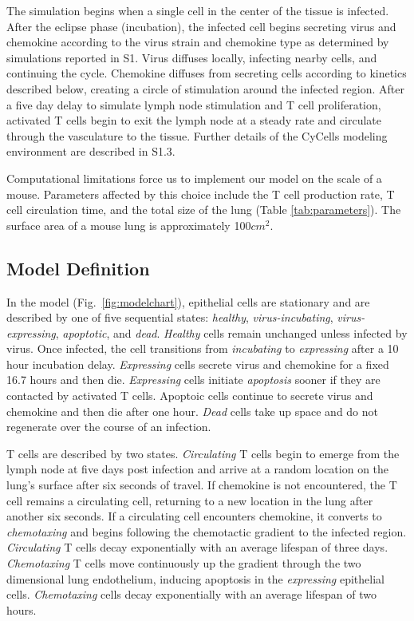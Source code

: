 \documentclass[10pt]{article}
\begin{document}
The simulation begins when a single cell in the center of the tissue is infected. After the eclipse phase (incubation), the infected cell begins secreting virus and chemokine according to the virus strain and chemokine type as determined by simulations reported in S1. Virus diffuses locally, infecting nearby cells, and continuing the cycle. Chemokine diffuses from secreting cells according to kinetics described below, creating a circle of stimulation around the infected region. After a five day delay to simulate lymph node stimulation and T cell proliferation, activated T cells begin to exit the lymph node at a steady rate and circulate through the vasculature to the tissue.  Further details of the CyCells modeling environment are described in S1.3.

Computational limitations force us to implement our model on the scale of a mouse.  Parameters affected by this choice include the T cell production rate, T cell circulation time, and the total size of the lung (Table \ref{tab:parameters}).  The surface area of a mouse lung is approximately 100$cm^2$.


\subsection*{Model Definition}

In the model (Fig.~\ref{fig:modelchart}), epithelial cells are stationary and are described by one of five sequential states: \textit{healthy}, \textit{virus-incubating}, \textit{virus-expressing}, \textit{apoptotic}, and \textit{dead}. \textit{Healthy} cells remain unchanged unless infected by virus. Once infected, the cell transitions from \textit{incubating} to \textit{expressing} after a 10 hour incubation delay. \textit{Expressing} cells secrete virus and chemokine for a fixed 16.7 hours and then die. \textit{Expressing} cells initiate \textit{apoptosis} sooner if they are contacted by activated T cells. Apoptoic cells continue to secrete virus and chemokine and then die after one hour. \textit{Dead} cells take up space and do not regenerate over the course of an infection.

T cells are described by two states. \textit{Circulating} T cells begin to emerge from the lymph node at five days post infection and arrive at a random location on the lung's surface after six seconds of travel.  If chemokine is not encountered, the T cell remains a circulating cell, returning to a new location in the lung after another six seconds.  If a circulating cell encounters chemokine, it converts to \textit{chemotaxing} and begins following the chemotactic gradient to the infected region. \textit{Circulating} T cells decay exponentially with an average lifespan of three days.  \textit{Chemotaxing} T cells move continuously up the gradient through the two dimensional lung endothelium, inducing apoptosis in the \textit{expressing} epithelial cells. \textit{Chemotaxing} cells decay exponentially with an average lifespan of two hours. 
\end{document}
